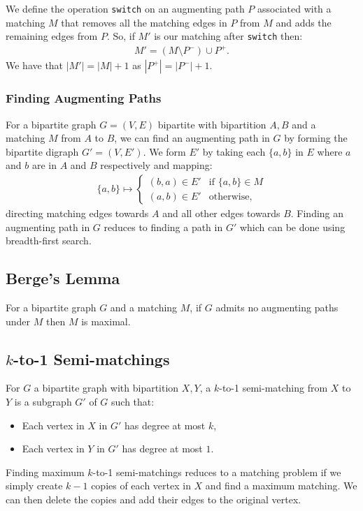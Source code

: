 We define the operation \texttt{switch} on an augmenting path $P$ 
associated with a matching $M$ that removes all the matching edges 
in $P$ from $M$ and adds the remaining edges from $P$.
So, if $M'$ is our matching after \texttt{switch} then: 
\begin{gather*}
  M' = (M \setminus P^-) \cup P^+.
\end{gather*} We have that $|M'| = |M| + 1$ as $|P^+| = |P^-| + 1$.

\subsubsection{Finding Augmenting Paths}

For a bipartite graph $G = (V, E)$ bipartite with bipartition $A, B$
and a matching $M$ from $A$ to $B$, we can find an augmenting path in
$G$ by forming the bipartite digraph $G' = (V, E')$. We form $E'$ by
taking each $\{a, b\}$ in $E$ where $a$ and $b$ are in $A$ and $B$ 
respectively and mapping:
\begin{gather*}
  \{a, b\} \mapsto \begin{cases}
    (b, a) \in E' & \text{if } \{a, b\} \in M \\
    (a, b) \in E' & \text{otherwise},
  \end{cases}
\end{gather*} directing matching edges towards $A$ and all other edges
towards $B$. Finding an augmenting path in $G$ reduces to finding a
path in $G'$ which can be done using breadth-first search.

\subsection{Berge's Lemma}

For a bipartite graph $G$ and a matching $M$, if $G$ admits no augmenting
paths under $M$ then $M$ is maximal.

\subsection{$k$-to-1 Semi-matchings}

For $G$ a bipartite graph with bipartition $X, Y$,
a $k$-to-1 semi-matching from $X$ to $Y$ is a subgraph $G'$ of $G$
such that: \begin{itemize}
  \item Each vertex in $X$ in $G'$ has degree at most $k$,
  \item Each vertex in $Y$ in $G'$ has degree at most $1$.
\end{itemize} Finding maximum $k$-to-1 semi-matchings reduces to 
a matching problem if we simply create $k - 1$ copies of each
vertex in $X$ and find a maximum matching. We can then delete the
copies and add their edges to the original vertex.

